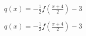 {$q(x) = -\frac{1}{2}f\left(\frac{x + 4}{2}\right) - 3$}
{$q(x) = -\frac{1}{2}f\left(\frac{x + 4}{2}\right) - 3$

}